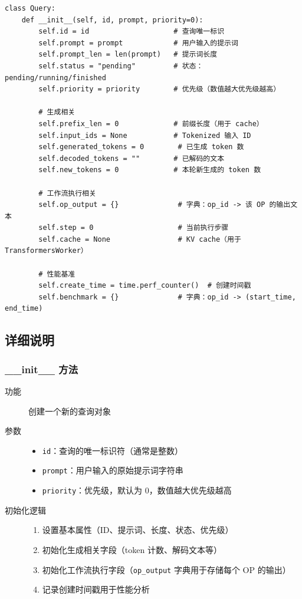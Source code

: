 \documentclass[12pt,a4paper]{article}
\begin{document}
\begin{lstlisting}
class Query:
    def __init__(self, id, prompt, priority=0):
        self.id = id                    # 查询唯一标识
        self.prompt = prompt            # 用户输入的提示词
        self.prompt_len = len(prompt)   # 提示词长度
        self.status = "pending"         # 状态：pending/running/finished
        self.priority = priority        # 优先级（数值越大优先级越高）
        
        # 生成相关
        self.prefix_len = 0             # 前缀长度（用于 cache）
        self.input_ids = None           # Tokenized 输入 ID
        self.generated_tokens = 0        # 已生成 token 数
        self.decoded_tokens = ""        # 已解码的文本
        self.new_tokens = 0             # 本轮新生成的 token 数
        
        # 工作流执行相关
        self.op_output = {}              # 字典：op_id -> 该 OP 的输出文本
        self.step = 0                    # 当前执行步骤
        self.cache = None                # KV cache（用于 TransformersWorker）
        
        # 性能基准
        self.create_time = time.perf_counter()  # 创建时间戳
        self.benchmark = {}              # 字典：op_id -> (start_time, end_time)
\end{lstlisting}

\subsection{详细说明}

\subsubsection{\_\_init\_\_ 方法}
\begin{description}
    \item[功能] 创建一个新的查询对象
    \item[参数]
    \begin{itemize}
        \item \texttt{id}：查询的唯一标识符（通常是整数）
        \item \texttt{prompt}：用户输入的原始提示词字符串
        \item \texttt{priority}：优先级，默认为 0，数值越大优先级越高
    \end{itemize}
    \item[初始化逻辑]
    \begin{enumerate}
        \item 设置基本属性（ID、提示词、长度、状态、优先级）
        \item 初始化生成相关字段（token 计数、解码文本等）
        \item 初始化工作流执行字段（\texttt{op_output} 字典用于存储每个 OP 的输出）
        \item 记录创建时间戳用于性能分析
    \end{enumerate}
\end{description}
\end{document}
